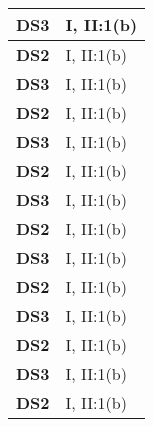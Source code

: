 \begin{xltabular}{\linewidth}{ l | X }
    \textbf{DS3} & I, II:1(b) \\ \hline

    \textbf{DS2} & I, II:1(b) \\ \hline

    \textbf{DS3} & I, II:1(b) \\ \hline

    \textbf{DS2} & I, II:1(b) \\ \hline

    \textbf{DS3} & I, II:1(b) \\ \hline

    \textbf{DS2} & I, II:1(b) \\ \hline

    \textbf{DS3} & I, II:1(b) \\ \hline

    \textbf{DS2} & I, II:1(b) \\ \hline

    \textbf{DS3} & I, II:1(b) \\ \hline

    \textbf{DS2} & I, II:1(b) \\ \hline

    \textbf{DS3} & I, II:1(b) \\ \hline

    \textbf{DS2} & I, II:1(b) \\ \hline

    \textbf{DS3} & I, II:1(b) \\ \hline

    \textbf{DS2} & I, II:1(b) \\ \hline \hline

\end{xltabular}